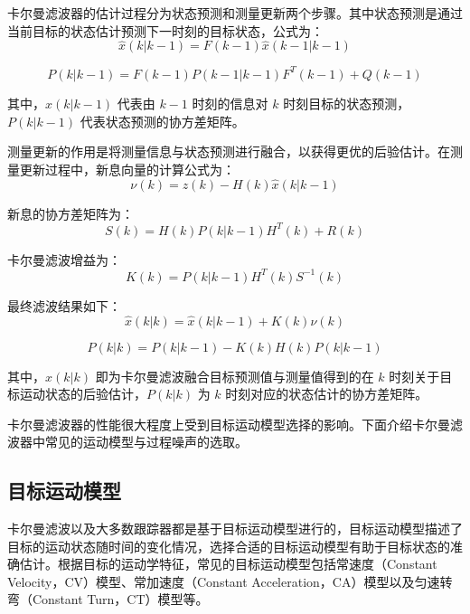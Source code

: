 \documentclass{xdupgthesis}
\begin{document}
卡尔曼滤波器的估计过程分为状态预测和测量更新两个步骤。其中状态预测是通过当前目标的状态估计预测下一时刻的目标状态，公式为：
\begin{equation}
	\hat{x}(k|k-1)=F(k-1)\hat{x}(k-1|k-1)
	\tag{2-8}
\end{equation}

\begin{equation}
	P(k|k-1)=F(k-1)P(k-1|k-1)F^{T}(k-1)+Q(k-1)
	\tag{2-9}
\end{equation}

其中，$\hat{x}(k|k-1)$ 代表由 $k-1$ 时刻的信息对 $k$ 时刻目标的状态预测，$P(k|k-1)$ 代表状态预测的协方差矩阵。

测量更新的作用是将测量信息与状态预测进行融合，以获得更优的后验估计。在测量更新过程中，新息向量的计算公式为：
\begin{equation}
	\nu(k)=z(k)-H(k)\hat{x}(k|k-1)
	\tag{2-10}
\end{equation}

新息的协方差矩阵为：
\begin{equation}
	S(k)=H(k)P(k|k-1)H^{T}(k)+R(k)
	\tag{2-11}
\end{equation}

卡尔曼滤波增益为：
\begin{equation}
	K(k)=P(k|k-1)H^{T}(k)S^{-1}(k)
	\tag{2-12}
\end{equation}

最终滤波结果如下：
\begin{equation}
	\hat{x}(k|k)=\hat{x}(k|k-1)+K(k)\nu(k)
	\tag{2-13}
\end{equation}

\begin{equation}
	P(k|k)=P(k|k-1)-K(k)H(k)P(k|k-1)
	\tag{2-14}
\end{equation}

其中，$\hat{x}(k|k)$ 即为卡尔曼滤波融合目标预测值与测量值得到的在 $k$ 时刻关于目标运动状态的后验估计，$P(k|k)$ 为 $k$ 时刻对应的状态估计的协方差矩阵。

卡尔曼滤波器的性能很大程度上受到目标运动模型选择的影响。下面介绍卡尔曼滤波器中常见的运动模型与过程噪声的选取。

\subsection{目标运动模型}

卡尔曼滤波以及大多数跟踪器都是基于目标运动模型进行的，目标运动模型描述了目标的运动状态随时间的变化情况，选择合适的目标运动模型有助于目标状态的准确估计。根据目标的运动学特征，常见的目标运动模型包括常速度（Constant Velocity，CV）模型、常加速度（Constant Acceleration，CA）模型以及匀速转弯（Constant Turn，CT）模型等。
\end{document}
